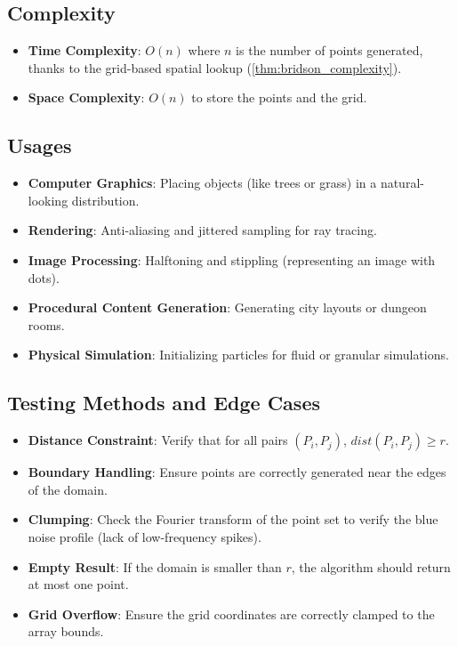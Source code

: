 \subsection{Complexity}
\begin{itemize}
    \item \textbf{Time Complexity}: $O(n)$ where $n$ is the number of points generated, thanks to the grid-based spatial lookup (\cref{thm:bridson_complexity}).
    \item \textbf{Space Complexity}: $O(n)$ to store the points and the grid.
\end{itemize}

\subsection{Usages}
\begin{itemize}
    \item \textbf{Computer Graphics}: Placing objects (like trees or grass) in a natural-looking distribution.
    \item \textbf{Rendering}: Anti-aliasing and jittered sampling for ray tracing.
    \item \textbf{Image Processing}: Halftoning and stippling (representing an image with dots).
    \item \textbf{Procedural Content Generation}: Generating city layouts or dungeon rooms.
    \item \textbf{Physical Simulation}: Initializing particles for fluid or granular simulations.
\end{itemize}

\subsection{Testing Methods and Edge Cases}
\begin{itemize}
    \item \textbf{Distance Constraint}: Verify that for all pairs $(P_i, P_j)$, $dist(P_i, P_j) \ge r$.
    \item \textbf{Boundary Handling}: Ensure points are correctly generated near the edges of the domain.
    \item \textbf{Clumping}: Check the Fourier transform of the point set to verify the blue noise profile (lack of low-frequency spikes).
    \item \textbf{Empty Result}: If the domain is smaller than $r$, the algorithm should return at most one point.
    \item \textbf{Grid Overflow}: Ensure the grid coordinates are correctly clamped to the array bounds.
\end{itemize}


